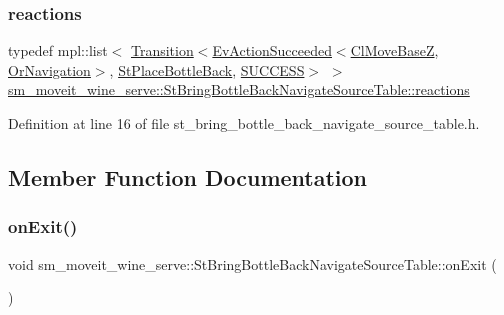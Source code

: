 \subsubsection{\texorpdfstring{reactions}{reactions}}
{\footnotesize\ttfamily typedef mpl\+::list$<$ \hyperlink{classsmacc_1_1Transition}{Transition}$<$\hyperlink{structsmacc_1_1default__events_1_1EvActionSucceeded}{Ev\+Action\+Succeeded}$<$\hyperlink{classcl__move__base__z_1_1ClMoveBaseZ}{Cl\+Move\+BaseZ}, \hyperlink{classsm__moveit__wine__serve_1_1OrNavigation}{Or\+Navigation}$>$, \hyperlink{structsm__moveit__wine__serve_1_1StPlaceBottleBack}{St\+Place\+Bottle\+Back}, \hyperlink{structsmacc_1_1default__transition__tags_1_1SUCCESS}{S\+U\+C\+C\+E\+SS}$>$ $>$ \hyperlink{structsm__moveit__wine__serve_1_1StBringBottleBackNavigateSourceTable_a0ac0aa893d92d3a8420ee32cfb082a03}{sm\+\_\+moveit\+\_\+wine\+\_\+serve\+::\+St\+Bring\+Bottle\+Back\+Navigate\+Source\+Table\+::reactions}}



Definition at line 16 of file st\+\_\+bring\+\_\+bottle\+\_\+back\+\_\+navigate\+\_\+source\+\_\+table.\+h.



\subsection{Member Function Documentation}
\mbox{\label{structsm__moveit__wine__serve_1_1StBringBottleBackNavigateSourceTable_ad5db6c6e7bd6cd2319580e02ed995c03}} 
\subsubsection{\texorpdfstring{on\+Exit()}{onExit()}}
{\footnotesize\ttfamily void sm\+\_\+moveit\+\_\+wine\+\_\+serve\+::\+St\+Bring\+Bottle\+Back\+Navigate\+Source\+Table\+::on\+Exit (\begin{DoxyParamCaption}{ }\end{DoxyParamCaption})\hspace{0.3cm}{\ttfamily [inline]}}



